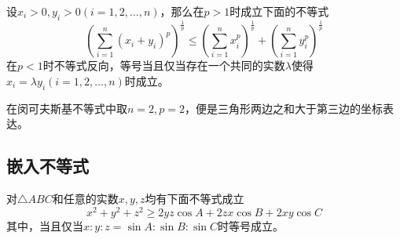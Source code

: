 \begin{theorem}[闵可夫斯基不等式]
  设$x_i>0, y_i>0 (i=1,2,\ldots,n)$，那么在$p>1$时成立下面的不等式
  \begin{equation}
    \label{eq:holder-inequation}
    \left( \sum_{i=1}^n(x_i+y_i)^p \right)^{\frac{1}{p}} \leqslant \left( \sum_{i=1}^nx_i^p \right)^{\frac{1}{p}} + \left( \sum_{i=1}^ny_i^p \right)^{\frac{1}{p}}
  \end{equation}
  在$p<1$时不等式反向，等号当且仅当存在一个共同的实数$\lambda$使得$x_i=\lambda y_i(i=1,2,\ldots,n)$时成立。
\end{theorem}
在闵可夫斯基不等式中取$n=2,p=2$，便是三角形两边之和大于第三边的坐标表达。

\subsection{嵌入不等式}

\begin{theorem}[嵌入不等式]
  对$\triangle ABC$和任意的实数$x,y,z$均有下面不等式成立
  \begin{equation}
    \label{eq:embedding-inequation}
    x^2+y^2+z^2 \geqslant 2yz\cos{A}+2zx\cos{B}+2xy\cos{C}
  \end{equation}
  其中，当且仅当$x:y:z = \sin{A} : \sin{B} : \sin{C}$时等号成立。
\end{theorem}

